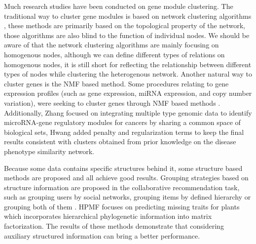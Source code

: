 \documentclass{bmcart}
\begin{document}
Much research studies have been conducted on gene module clustering. The traditional way to cluster gene modules is based on network clustering algorithms \cite{Girvan2002,Ahn2010,Gopalan2013,Didier2015}, these methods are primarily based on the topological property of the network, those algorithms are also blind to the function of individual nodes.
We should be aware of that the network clustering algorithms are mainly focusing on homogenous nodes, although we can define different types of relations on homogenous nodes, it is still short for reflecting the relationship between different types of nodes while clustering the heterogenous network.
Another natural way to cluster genes is the NMF based method. Some procedures relating to gene expression profiles (such as gene expression, miRNA expression, and copy number variation), were seeking to cluster genes through NMF based methods \cite{XiaoLiu2015,Zhang2015,Wang2015}. Additionally, Zhang \cite{Zhang2011} focused on integrating multiple type genomic data to identify microRNA-gene regulatory modules for cancers by sharing a common space of biological sets,
Hwang \cite{Hwang2012} added penalty and regularization terms to keep the final results consistent with clusters obtained from prior knowledge on the disease phenotype similarity network. 

 Because some data contains specific structures behind it, some structure based methods are proposed and all achieve good results. Grouping strategies based on structure information are proposed in the collaborative recommendation task, such as grouping users by social networks, grouping items by defined hierarchy or grouping both of them \cite{Wang2014,Ma2008,AliMashhoori2012}. HPMF \cite{Shan2012} focuses on predicting missing traits for plants which incorporates hierarchical phylogenetic information into matrix factorization. The results of these methods demonstrate that considering auxiliary structured information can bring a better performance.
\end{document}

